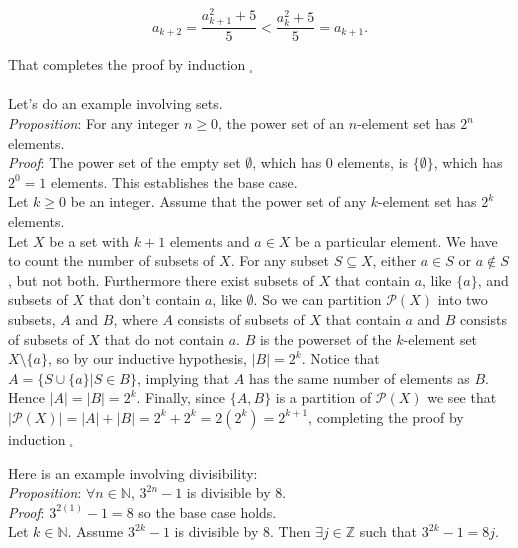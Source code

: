 \documentclass[12pt]{amsart}
\theoremstyle{definition}
\theoremstyle{remark}
\newcommand{\nats}{\mathbb N}
\newcommand{\ints}{\mathbb Z}
\newcommand{\powerset}{\mathscr P}
\begin{document}
$$a_{k+2}=\frac{a_{k+1}^{2} +5}{5}<\frac{a_{k}^{2} +5}{5}=a_{k+1}.$$


That completes the proof by induction$\;_{\square}$\\ \\

Let's do an example involving sets.\\

\emph{Proposition}:  For any integer $n\geq 0$, the power set of an $n$-element set has $2^n$ elements.\\

\emph{Proof}:  The power set of the empty set $\emptyset$, which has $0$ elements, is $\{\emptyset\}$, which has $2^0=1$ elements.  This establishes the base case.  \\

Let $k\geq 0$ be an integer.  Assume that the power set of any $k$-element set has $2^k$ elements.  \\

Let $X$ be a set with $k+1$ elements and $a\in X$ be a particular element.  We have to count the number of subsets of $X$.  For any subset $S\subseteq X$, either $a\in S$ or $a\not\in S$, but not both.  Furthermore there exist subsets of $X$ that contain $a$, like $\{a\}$, and subsets of $X$ that don't contain $a$, like $\emptyset$.  So we can partition $\powerset{(X)}$ into two subsets, $A$ and $B$, where $A$ consists of subsets of $X$ that contain $a$ and $B$ consists of subsets of $X$ that do not contain $a$.  $B$ is the powerset of the $k$-element set $X\setminus \{a\}$, so by our inductive hypothesis, $|B|=2^k$.  Notice that $A=\{S\cup\{a\} |S\in B\}$, implying that $A$ has the same number of elements as $B$.  Hence $|A|=|B|=2^k$.  Finally, since $\{A,B\}$ is a partition of $\powerset{(X)}$ we see that $|\powerset{(X)}|=|A|+|B|=2^k+2^k=2(2^k)=2^{k+1}$, completing the proof by induction$\;_{\square}$

\newpage

Here is an example involving divisibility:\\

\emph{Proposition}:  $\forall n\in\nats$, $3^{2n}-1$ is divisible by $8$.\\

\emph{Proof}:  $3^{2(1)}-1=8$ so the base case holds.  \\

Let $k\in\nats$.  Assume  $3^{2k}-1$ is divisible by $8$.  Then $\exists j\in\ints$ such that $3^{2k}-1=8j$.\\
\end{document}
